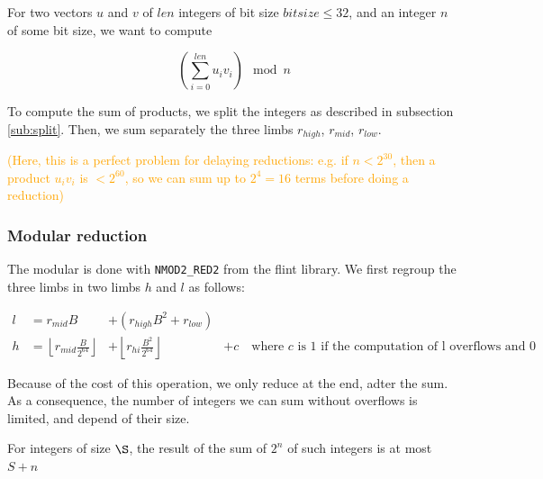 \documentclass[a4paper]{article}
\begin{document}
For two vectors $u$ and $v$ of $len$ integers of bit size $bitsize \le 32$, and an integer $n$ of some bit size, we want to compute

\[\left(\sum_{i=0}^{len}u_iv_i\right) \mod n\]

To compute the sum of products, we split the integers as described in subsection \ref{sub:split}. Then, we sum separately the three limbs $r_{high}$, $r_{mid}$, $r_{low}$. %

\textcolor{orange}{(Here, this is a perfect problem for delaying reductions: e.g. if \(n < 2^{30}\), then a product \(u_iv_i\) is \(< 2^{60}\), so we can sum up to \(2^4 = 16\) terms before doing a reduction)}

\subsubsection{Modular reduction}

The modular is done with \texttt{NMOD2\_RED2} from the flint library. We first regroup the three limbs in two limbs $h$ and $l$ as follows:

\begin{align}
    l &= r_{mid}B &+ \left(r_{high}B^2 + r_{low}\right) \\
    h &= \left\lfloor r_{mid}\frac{B}{2^{64}}\right\rfloor &+ \left\lfloor r_{hi}\frac{B^2}{2^{64}}\right\rfloor &+ c \quad{\text{where $c$ is $1$ if the computation of l overflows and 0 otherwise}}
\end{align}

Because of the cost of this operation, we only reduce at the end, adter the sum. As a consequence, the number of integers we can sum without overflows is limited, and depend of their size.

\begin{proposition}\label{prop:sum}
    For integers of size $\S$, the result of the sum of $2^n$ of such integers is at most $S + n$
\end{proposition}
\end{document}
